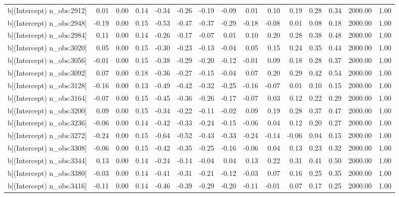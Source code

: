 \begin{table}[ht]
\begin{tabular}{rrrrrrrrrrrrrrr}
  b[(Intercept) n\_obs:2912] & 0.01 & 0.00 & 0.14 & -0.34 & -0.26 & -0.19 & -0.09 & 0.01 & 0.10 & 0.19 & 0.28 & 0.34 & 2000.00 & 1.00 \\ 
  b[(Intercept) n\_obs:2948] & -0.19 & 0.00 & 0.15 & -0.53 & -0.47 & -0.37 & -0.29 & -0.18 & -0.08 & 0.01 & 0.08 & 0.18 & 2000.00 & 1.00 \\ 
  b[(Intercept) n\_obs:2984] & 0.11 & 0.00 & 0.14 & -0.26 & -0.17 & -0.07 & 0.01 & 0.10 & 0.20 & 0.28 & 0.38 & 0.48 & 2000.00 & 1.00 \\ 
  b[(Intercept) n\_obs:3020] & 0.05 & 0.00 & 0.15 & -0.30 & -0.23 & -0.13 & -0.04 & 0.05 & 0.15 & 0.24 & 0.35 & 0.44 & 2000.00 & 1.00 \\ 
  b[(Intercept) n\_obs:3056] & -0.01 & 0.00 & 0.15 & -0.38 & -0.29 & -0.20 & -0.12 & -0.01 & 0.09 & 0.18 & 0.28 & 0.37 & 2000.00 & 1.00 \\ 
  b[(Intercept) n\_obs:3092] & 0.07 & 0.00 & 0.18 & -0.36 & -0.27 & -0.15 & -0.04 & 0.07 & 0.20 & 0.29 & 0.42 & 0.54 & 2000.00 & 1.00 \\ 
  b[(Intercept) n\_obs:3128] & -0.16 & 0.00 & 0.13 & -0.49 & -0.42 & -0.32 & -0.25 & -0.16 & -0.07 & 0.01 & 0.10 & 0.15 & 2000.00 & 1.00 \\ 
  b[(Intercept) n\_obs:3164] & -0.07 & 0.00 & 0.15 & -0.45 & -0.36 & -0.26 & -0.17 & -0.07 & 0.03 & 0.12 & 0.22 & 0.29 & 2000.00 & 1.00 \\ 
  b[(Intercept) n\_obs:3200] & 0.09 & 0.00 & 0.15 & -0.34 & -0.22 & -0.11 & -0.02 & 0.09 & 0.19 & 0.28 & 0.37 & 0.47 & 2000.00 & 1.00 \\ 
  b[(Intercept) n\_obs:3236] & -0.06 & 0.00 & 0.14 & -0.42 & -0.33 & -0.24 & -0.15 & -0.06 & 0.04 & 0.12 & 0.20 & 0.27 & 2000.00 & 1.00 \\ 
  b[(Intercept) n\_obs:3272] & -0.24 & 0.00 & 0.15 & -0.64 & -0.52 & -0.43 & -0.33 & -0.24 & -0.14 & -0.06 & 0.04 & 0.15 & 2000.00 & 1.00 \\ 
  b[(Intercept) n\_obs:3308] & -0.06 & 0.00 & 0.15 & -0.42 & -0.35 & -0.25 & -0.16 & -0.06 & 0.04 & 0.13 & 0.23 & 0.32 & 2000.00 & 1.00 \\ 
  b[(Intercept) n\_obs:3344] & 0.13 & 0.00 & 0.14 & -0.24 & -0.14 & -0.04 & 0.04 & 0.13 & 0.22 & 0.31 & 0.41 & 0.50 & 2000.00 & 1.00 \\ 
  b[(Intercept) n\_obs:3380] & -0.03 & 0.00 & 0.14 & -0.41 & -0.31 & -0.21 & -0.12 & -0.03 & 0.07 & 0.16 & 0.25 & 0.35 & 2000.00 & 1.00 \\ 
  b[(Intercept) n\_obs:3416] & -0.11 & 0.00 & 0.14 & -0.46 & -0.39 & -0.29 & -0.20 & -0.11 & -0.01 & 0.07 & 0.17 & 0.25 & 2000.00 & 1.00 \\ 

\end{tabular}
\end{table}
